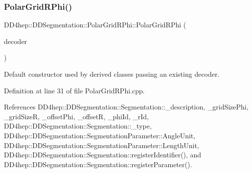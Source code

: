 \hypertarget{class_d_d4hep_1_1_d_d_segmentation_1_1_polar_grid_r_phi_aca178a8d2d6a77ea6e33dddb479bbbd9}{}\label{class_d_d4hep_1_1_d_d_segmentation_1_1_polar_grid_r_phi_aca178a8d2d6a77ea6e33dddb479bbbd9} 
\subsubsection{\texorpdfstring{Polar\+Grid\+R\+Phi()}{PolarGridRPhi()}\hspace{0.1cm}{\footnotesize\ttfamily [2/2]}}
{\footnotesize\ttfamily D\+D4hep\+::\+D\+D\+Segmentation\+::\+Polar\+Grid\+R\+Phi\+::\+Polar\+Grid\+R\+Phi (\begin{DoxyParamCaption}\item[{\hyperlink{class_d_d4hep_1_1_d_d_segmentation_1_1_bit_field64}{Bit\+Field64} $\ast$}]{decoder }\end{DoxyParamCaption})}



Default constructor used by derived classes passing an existing decoder. 



Definition at line 31 of file Polar\+Grid\+R\+Phi.\+cpp.



References D\+D4hep\+::\+D\+D\+Segmentation\+::\+Segmentation\+::\+\_\+description, \+\_\+grid\+Size\+Phi, \+\_\+grid\+SizeR, \+\_\+offset\+Phi, \+\_\+offsetR, \+\_\+phi\+Id, \+\_\+r\+Id, D\+D4hep\+::\+D\+D\+Segmentation\+::\+Segmentation\+::\+\_\+type, D\+D4hep\+::\+D\+D\+Segmentation\+::\+Segmentation\+Parameter\+::\+Angle\+Unit, D\+D4hep\+::\+D\+D\+Segmentation\+::\+Segmentation\+Parameter\+::\+Length\+Unit, D\+D4hep\+::\+D\+D\+Segmentation\+::\+Segmentation\+::register\+Identifier(), and D\+D4hep\+::\+D\+D\+Segmentation\+::\+Segmentation\+::register\+Parameter().

\hypertarget{class_d_d4hep_1_1_d_d_segmentation_1_1_polar_grid_r_phi_a6801dd3c1227633c1865d9f4acf3b7cb}{}\label{class_d_d4hep_1_1_d_d_segmentation_1_1_polar_grid_r_phi_a6801dd3c1227633c1865d9f4acf3b7cb} 
